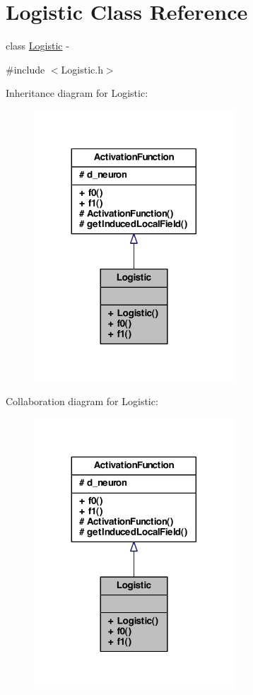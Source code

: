 \hypertarget{class_logistic}{
\section{Logistic Class Reference}
\label{class_logistic}
}


class \hyperlink{class_logistic}{Logistic} -\/  




{\ttfamily \#include $<$Logistic.h$>$}



Inheritance diagram for Logistic:
\nopagebreak
\begin{figure}[H]
\begin{center}
\leavevmode
\includegraphics[width=212pt]{class_logistic__inherit__graph}
\end{center}
\end{figure}


Collaboration diagram for Logistic:
\nopagebreak
\begin{figure}[H]
\begin{center}
\leavevmode
\includegraphics[width=212pt]{class_logistic__coll__graph}
\end{center}
\end{figure}
